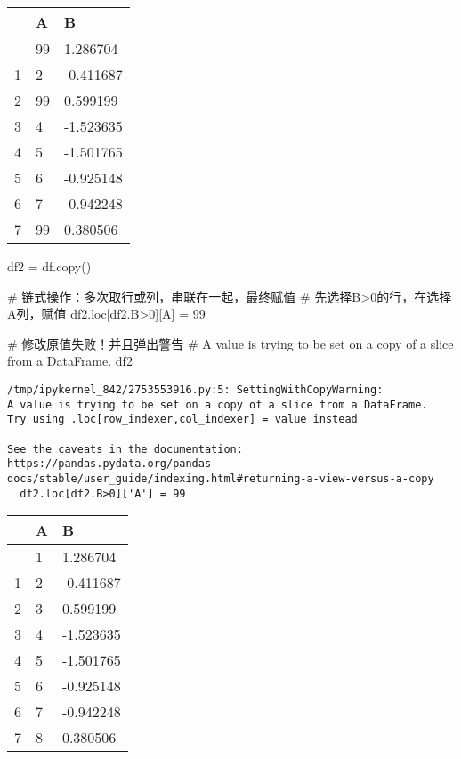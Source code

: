\documentclass[
  letterpaper,
  DIV=11,
  numbers=noendperiod]{scrreprt}
\newenvironment{Shaded}{\begin{snugshade}}{\end{snugshade}}
\newcommand{\CommentTok}[1]{\textcolor[rgb]{0.37,0.37,0.37}{#1}}
\newcommand{\DecValTok}[1]{\textcolor[rgb]{0.68,0.00,0.00}{#1}}
\newcommand{\NormalTok}[1]{\textcolor[rgb]{0.00,0.23,0.31}{#1}}
\newcommand{\OperatorTok}[1]{\textcolor[rgb]{0.37,0.37,0.37}{#1}}
\newcommand{\StringTok}[1]{\textcolor[rgb]{0.13,0.47,0.30}{#1}}
\begin{document}
\begin{longtable}[]{@{}lll@{}}
\toprule\noalign{}
& A & B \\
\midrule\noalign{}
\endhead
\bottomrule\noalign{}
\endlastfoot
0 & 99 & 1.286704 \\
1 & 2 & -0.411687 \\
2 & 99 & 0.599199 \\
3 & 4 & -1.523635 \\
4 & 5 & -1.501765 \\
5 & 6 & -0.925148 \\
6 & 7 & -0.942248 \\
7 & 99 & 0.380506 \\
\end{longtable}

\begin{Shaded}
\begin{Highlighting}[]
\NormalTok{df2 }\OperatorTok{=}\NormalTok{ df.copy() }

\CommentTok{\# 链式操作：多次取行或列，串联在一起，最终赋值}
\CommentTok{\# 先选择B\textgreater{}0的行，在选择A列，赋值}
\NormalTok{df2.loc[df2.B}\OperatorTok{\textgreater{}}\DecValTok{0}\NormalTok{][}\StringTok{\textquotesingle{}A\textquotesingle{}}\NormalTok{] }\OperatorTok{=} \DecValTok{99}

\CommentTok{\# 修改原值失败！并且弹出警告}
\CommentTok{\# A value is trying to be set on a copy of a slice from a DataFrame.}
\NormalTok{df2}
\end{Highlighting}
\end{Shaded}

\begin{verbatim}
/tmp/ipykernel_842/2753553916.py:5: SettingWithCopyWarning: 
A value is trying to be set on a copy of a slice from a DataFrame.
Try using .loc[row_indexer,col_indexer] = value instead

See the caveats in the documentation: https://pandas.pydata.org/pandas-docs/stable/user_guide/indexing.html#returning-a-view-versus-a-copy
  df2.loc[df2.B>0]['A'] = 99
\end{verbatim}

\begin{longtable}[]{@{}lll@{}}
\toprule\noalign{}
& A & B \\
\midrule\noalign{}
\endhead
\bottomrule\noalign{}
\endlastfoot
0 & 1 & 1.286704 \\
1 & 2 & -0.411687 \\
2 & 3 & 0.599199 \\
3 & 4 & -1.523635 \\
4 & 5 & -1.501765 \\
5 & 6 & -0.925148 \\
6 & 7 & -0.942248 \\
7 & 8 & 0.380506 \\
\end{longtable}
\end{document}
